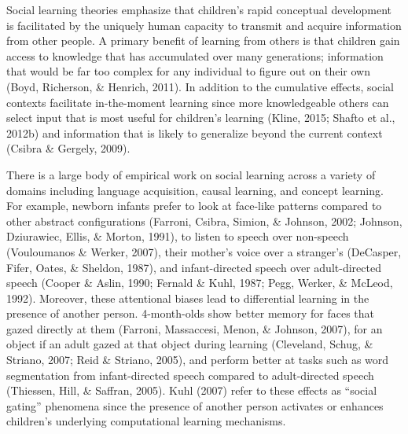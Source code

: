 \documentclass[oneside]{report}
\begin{document}
Social learning theories emphasize that children's rapid conceptual
development is facilitated by the uniquely human capacity to transmit
and acquire information from other people. A primary benefit of learning
from others is that children gain access to knowledge that has
accumulated over many generations; information that would be far too
complex for any individual to figure out on their own (Boyd, Richerson,
\& Henrich, 2011). In addition to the cumulative effects, social
contexts facilitate in-the-moment learning since more knowledgeable
others can select input that is most useful for children's learning
(Kline, 2015; Shafto et al., 2012b) and information that is likely to
generalize beyond the current context (Csibra \& Gergely, 2009).

There is a large body of empirical work on social learning across a
variety of domains including language acquisition, causal learning, and
concept learning. For example, newborn infants prefer to look at
face-like patterns compared to other abstract configurations (Farroni,
Csibra, Simion, \& Johnson, 2002; Johnson, Dziurawiec, Ellis, \& Morton,
1991), to listen to speech over non-speech (Vouloumanos \& Werker,
2007), their mother's voice over a stranger's (DeCasper, Fifer, Oates,
\& Sheldon, 1987), and infant-directed speech over adult-directed speech
(Cooper \& Aslin, 1990; Fernald \& Kuhl, 1987; Pegg, Werker, \& McLeod,
1992). Moreover, these attentional biases lead to differential learning
in the presence of another person. 4-month-olds show better memory for
faces that gazed directly at them (Farroni, Massaccesi, Menon, \&
Johnson, 2007), for an object if an adult gazed at that object during
learning (Cleveland, Schug, \& Striano, 2007; Reid \& Striano, 2005),
and perform better at tasks such as word segmentation from
infant-directed speech compared to adult-directed speech (Thiessen,
Hill, \& Saffran, 2005). Kuhl (2007) refer to these effects as ``social
gating'' phenomena since the presence of another person activates or
enhances children's underlying computational learning mechanisms.
\end{document}
